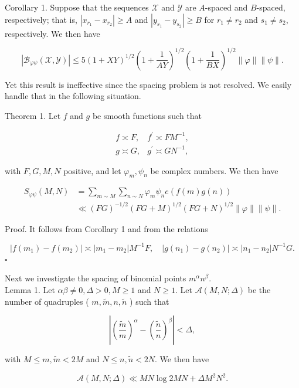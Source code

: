\documentclass[10pt]{article}
\begin{document}
Corollary 1. Suppose that the sequences $\mathscr{X}$ and $\mathscr{Y}$ are $A$-spaced and $B$-spaced, respectively; that is, $\left|x_{r_{1}}-x_{r_{2}}\right| \geqslant A$ and $\left|y_{s_{1}}-y_{s_{2}}\right| \geqslant B$ for $r_{1} \neq r_{2}$ and $s_{1} \neq s_{2}$, respectively. We then have

$$
\left|\mathscr{B}_{\varphi \psi}(\mathscr{X}, \mathscr{Y})\right| \leqslant 5(1+X Y)^{1 / 2}\left(1+\frac{1}{A Y}\right)^{1 / 2}\left(1+\frac{1}{B X}\right)^{1 / 2}\|\varphi\|\|\psi\| .
$$

Yet this result is ineffective since the spacing problem is not resolved. We easily handle that in the following situation.

Theorem 1. Let $f$ and $g$ be smooth functions such that

$$
\begin{array}{ll}
f \asymp F, & f^{\prime} \asymp F M^{-1}, \\
g \asymp G, & g^{\prime} \asymp G N^{-1},
\end{array}
$$

with $F, G, M, N$ positive, and let $\varphi_{m}, \psi_{n}$ be complex numbers. We then have

$$
\begin{aligned}
S_{\varphi \psi}(M, N) & =\sum_{m \sim M} \sum_{n \sim N} \varphi_{m} \psi_{n} e(f(m) g(n)) \\
& \ll(F G)^{-1 / 2}(F G+M)^{1 / 2}(F G+N)^{1 / 2}\|\varphi\|\|\psi\| .
\end{aligned}
$$

Proof. It follows from Corollary 1 and from the relations

$$
\left|f\left(m_{1}\right)-f\left(m_{2}\right)\right| \asymp\left|m_{1}-m_{2}\right| M^{-1} F, \quad\left|g\left(n_{1}\right)-g\left(n_{2}\right)\right| \asymp\left|n_{1}-n_{2}\right| N^{-1} G .
$$ \(\square\)

Next we investigate the spacing of binomial points $m^{\alpha} n^{\beta}$.\\
Lemma 1. Let $\alpha \beta \neq 0, \Delta>0, M \geqslant 1$ and $N \geqslant 1$. Let $\mathscr{A}(M, N ; \Delta)$ be the number of quadruples ( $m, \tilde{m}, n, \tilde{n}$ ) such that

$$
\left|\left(\frac{\tilde{m}}{m}\right)^{\alpha}-\left(\frac{\tilde{n}}{n}\right)^{\beta}\right|<\Delta,
$$

with $M \leqslant m, \tilde{m}<2 M$ and $N \leqslant n, \tilde{n}<2 N$. We then have

$$
\mathscr{A}(M, N ; \Delta) \ll M N \log 2 M N+\Delta M^{2} N^{2} .
$$
\end{document}

